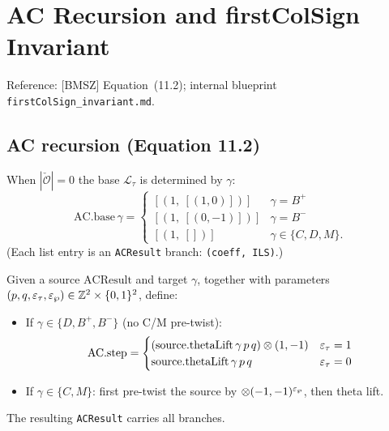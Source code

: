 \chapter{AC Recursion and firstColSign Invariant}
\label{chap:ac}

Reference: [BMSZ] Equation~(11.2); internal blueprint
\texttt{firstColSign\_invariant.md}.

\section{AC recursion (Equation 11.2)}

\begin{definition}
  \label{def:AC_base}
  \leanok
  When $|\check{\mathcal{O}}| = 0$ the base $\mathcal{L}_\tau$ is determined by $\gamma$:
  \[
    \mathrm{AC.base}\,\gamma = \begin{cases}
      [(1,\ [(1, 0)])] & \gamma = B^+ \\
      [(1,\ [(0, -1)])] & \gamma = B^- \\
      [(1,\ [])] & \gamma \in \{C, D, M\}.
    \end{cases}
  \]
  (Each list entry is an \texttt{ACResult} branch: \texttt{(coeff, ILS)}.)
\end{definition}

\begin{definition}
  \label{def:AC_step}
  \leanok
  Given a source $\mathrm{ACResult}$ and target $\gamma$, together with parameters
  $(p, q, \varepsilon_\tau, \varepsilon_\wp) \in \mathbb{Z}^2 \times \{0, 1\}^2$, define:
  \begin{itemize}
    \item If $\gamma \in \{D, B^+, B^-\}$ (no C/M pre-twist):
    \[
      \mathrm{AC.step} =
      \begin{cases}
        (\mathrm{source.thetaLift}\,\gamma\,p\,q)\otimes(1, -1) & \varepsilon_\tau = 1 \\
        \mathrm{source.thetaLift}\,\gamma\,p\,q & \varepsilon_\tau = 0
      \end{cases}
    \]
    \item If $\gamma \in \{C, M\}$: first pre-twist the source by $\otimes(-1, -1)^{\varepsilon_\wp}$, then theta lift.
  \end{itemize}
  The resulting \texttt{ACResult} carries all branches.
\end{definition}

